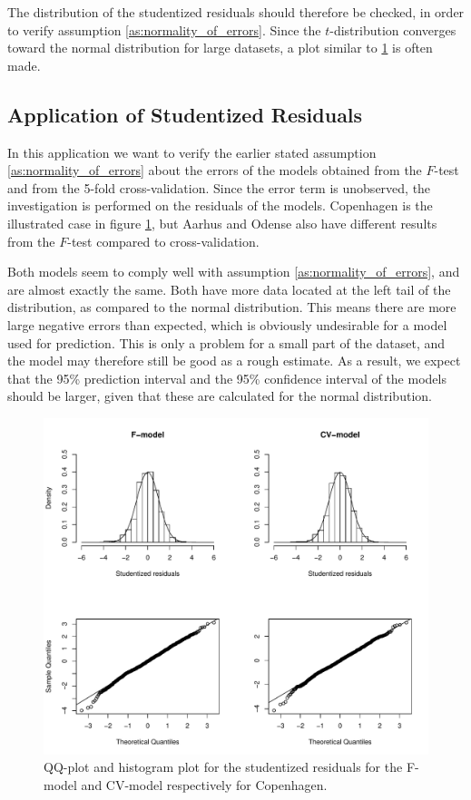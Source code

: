 The distribution of the studentized residuals should therefore be checked, in order to verify assumption \ref{as:normality_of_errors}. 
Since the $t$-distribution converges toward the normal distribution for large datasets, a plot similar to \ref{fig:studentized_res_plot} is often made.

\subsection{Application of Studentized Residuals} \label{sub:residuals}

In this application we want to verify the earlier stated assumption \ref{as:normality_of_errors} about the errors of the models obtained from the $F$-test and from the 5-fold cross-validation. 
Since the error term is unobserved, the investigation is performed on the residuals of the models.
Copenhagen is the illustrated case in figure \ref{fig:studentized_res_plot}, but Aarhus and Odense also have different results from the $F$-test compared to cross-validation.

Both models seem to comply well with assumption \ref{as:normality_of_errors}, and are almost exactly the same.
Both have more data located at the left tail of the distribution, as compared to the normal distribution. 
This means there are more large negative errors than expected, which is obviously undesirable for a model used for prediction. 
This is only a problem for a small part of the dataset, and the model may therefore still be good as a rough estimate. 
As a result, we expect that the 95\% prediction interval and the 95\% confidence interval of the models should be larger, given that these are calculated for the normal distribution.

\begin{figure}[H]
    \centering
  \includegraphics[width = 0.9 \textwidth]{figures/Nanna/studentized_res_plot.pdf}
  \caption{QQ-plot and histogram plot for the studentized residuals for the F-model and CV-model respectively for Copenhagen.}
  \label{fig:studentized_res_plot}
\end{figure}

